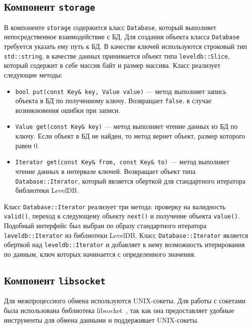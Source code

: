 \subsection{Компонент \texttt{storage}}
В компоненте \texttt{storage} содержится класс \texttt{Database}, который выполняет непосредственное взаимодействие с БД. Для создания объекта класса \texttt{Database} требуется указать ему путь к БД. В качестве ключей используются строковый тип \texttt{std::string}, в качестве данных принимается объект типа \texttt{leveldb::Slice}, который содержит в себе массив байт и размер массива. Класс реализует следующие методы:
\begin{itemize}
\item \texttt{bool put(const Key\& key, Value value)} --- метод выполняет запись объекта в БД по полученному ключу. Возвращает \texttt{false}, в случае возникновения ошибки при записи.
\item \texttt{Value get(const Key\& key)} --- метод выполняет чтение данных из БД по ключу. Если объект в БД не найден, то метод вернет объект, размер которого равен 0.
\item \texttt{Iterator get(const Key\& from, const Key\& to)} --- метод выполняет чтение данных в интервале ключей. Возвращает объект типа \texttt{Database::Iterator}, который является оберткой для стандартного итератора библиотеки LevelDB.
\end{itemize}

Класс \texttt{Database::Iterator} реализует три метода: проверку на валидность \texttt{valid()}, переход к следующему объекту \texttt{next()} и получение объекта \texttt{value()}. Подобный интерфейс был выбран по образу стандартного итератора \texttt{leveldb::Iterator} из библиотеки LevelDB. Класс \texttt{Database::Iterator} является оберткой над \texttt{leveldb::Iterator} и добавляет к нему возможность итерирования по данным, ключ которых начинается с определенного значения.

\subsection{Компонент \texttt{libsocket}}
Для межпроцессного обмена используются UNIX-сокеты. Для работы с сокетами была использована библиотека libsocket~\cite{libsocket}, так как она предоставляет удобные инструменты для обмена данными и поддерживает UNIX-сокеты.


